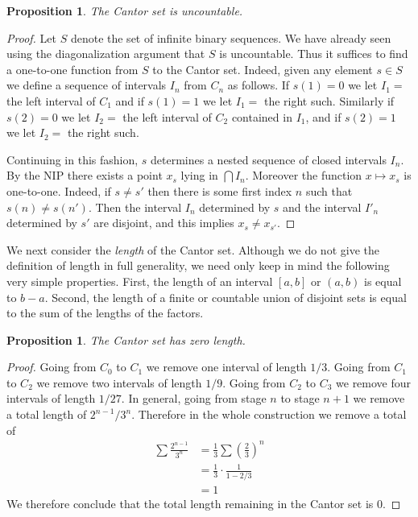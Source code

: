 \documentclass[11pt,oneside]{amsbook}
\theoremstyle{definition}
\theoremstyle{plain}
\newtheorem{prop}[thm]{Proposition}
\theoremstyle{definition}
\theoremstyle{remark}
\numberwithin{equation}{section}
\numberwithin{figure}{section}
\begin{document}
\begin{prop}
  The Cantor set is uncountable.
\end{prop}

\begin{proof}
  Let $S$ denote the set of infinite binary sequences. We have already seen using the diagonalization argument that $S$ is uncountable. Thus it suffices to find a one-to-one function from $S$ to the Cantor set. Indeed, given any element $s\in S$ we define a sequence of intervals $I_n$ from $C_n$ as follows. If $s(1)=0$ we let $I_1=$ the left interval of $C_1$ and if $s(1)=1$ we let $I_1=$ the right such. Similarly if $s(2)=0$ we let $I_2=$ the left interval of $C_2$ contained in $I_1$, and if $s(2)=1$ we let $I_2=$ the right such.

  Continuing in this fashion, $s$ determines a nested sequence of closed intervals $I_n$. By the NIP there exists a point $x_s$ lying in $\bigcap I_n$. Moreover the function $x\mapsto x_s$ is one-to-one. Indeed, if $s\neq s'$ then there is some first index $n$ such that $s(n)\neq s(n')$. Then the interval $I_n$ determined by $s$ and the interval $I'_n$ determined by $s'$ are disjoint, and this implies $x_s\neq x_{s'}$.
\end{proof}

We next consider the \emph{length} of the Cantor set. Although we do not give the definition of length in full generality, we need only keep in mind the following very simple properties. First, the length of an interval $[a,b]$ or $(a,b)$ is equal to $b-a$. Second, the length of a finite or countable union of disjoint sets is equal to the sum of the lengths of the factors.

\begin{prop}
  The Cantor set has zero length.
\end{prop}

\begin{proof}
  Going from $C_0$ to $C_1$ we remove one interval of length $1/3$. Going from $C_1$ to $C_2$ we remove two intervals of length $1/9$. Going from $C_2$ to $C_3$ we remove four intervals of length $1/27$. In general, going from stage $n$ to stage $n+1$ we remove a total length of $2^{n-1}/3^n$. Therefore in the whole construction we remove a total of
  \begin{align*}
    \sum\frac{2^{n-1}}{3^n}&=\frac13\sum\left(\frac23\right)^n\\
                           &=\frac13\cdot\frac{1}{1-2/3}\\
                           &=1
  \end{align*}
  We therefore conclude that the total length remaining in the Cantor set is $0$.
\end{proof}
\end{document}
